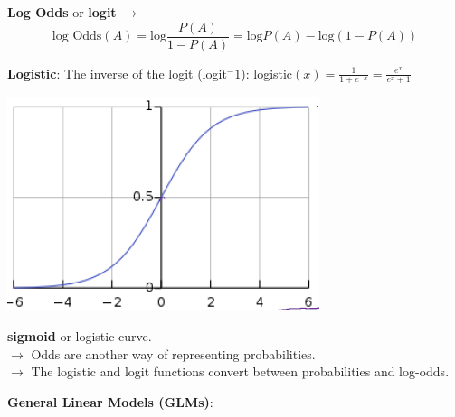 \documentclass[letterpaper, 10.5pt,landscape]{article}
\begin{document}
\begin{multicols*}{3}
\vspace{3pt}
\textbf{Log Odds} or \textbf{logit} $\rightarrow$
\vspace{-7pt}
\[\text{log Odds}(A) = \text{log} \frac{P(A)}{1-P(A)} = \text{log}P(A) - \text{log}\left(1-P(A) \right) \]
\vspace{-7pt}

\vspace{3pt}
\textbf{Logistic}: The inverse of the logit (logit$^-1$): 
logistic\((x) = \frac{1}{1+e^{-x}} = \frac{e^{x}}{e^{x} +1} \)

\vspace{3pt}


\begin{minipage}{0.5\linewidth}
    \centering
    \includegraphics[width=\textwidth]{figures/Logistics_sigmoid_curve.PNG}
\end{minipage}
\textbf{sigmoid} or logistic curve. \\

\vspace{3pt}
$\rightarrow$ Odds are another way of representing probabilities.\\
$\rightarrow$ The logistic and logit functions convert between probabilities and log-odds.


\vspace{3pt}
\textbf{General Linear Models (GLMs)}: 


\end{multicols*}
\end{document}
